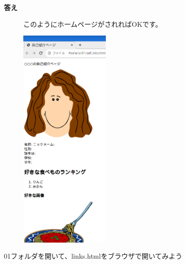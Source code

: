 \documentclass[a4paper,12pt]{jarticle}
\begin{document}
\bigskip

\clearpage
\textbf{答え}



\begin{figure}[hb]
  \centering
  \begin{minipage}{\textwidth}
    このようにホームページがされればOKです。

    \centering
    \includegraphics[width=0.4\textwidth]{textbook-img142.png}
  \end{minipage}

\end{figure}
\theQuestion\label{Q:hasAnswer04-1}

01フォルダを開いて、links.htmlをブラウザで開いてみよう


\bigskip

\vfill
\end{document}
